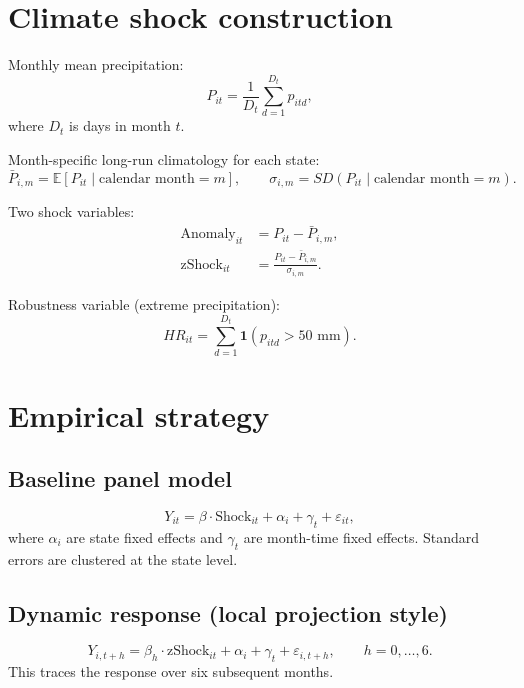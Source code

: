 \documentclass[11pt]{article}
\begin{document}
\section{Climate shock construction}
Monthly mean precipitation:
\begin{equation}
P_{it} = \frac{1}{D_t}\sum_{d=1}^{D_t} p_{itd},
\end{equation}
where $D_t$ is days in month $t$.

Month-specific long-run climatology for each state:
\begin{equation}
\bar P_{i,m} = \mathbb{E}[P_{it}\mid \text{calendar month}=m], \qquad
\sigma_{i,m} = SD(P_{it}\mid \text{calendar month}=m).
\end{equation}

Two shock variables:
\begin{align}
\text{Anomaly}_{it} &= P_{it} - \bar P_{i,m}, \\
\text{zShock}_{it} &= \frac{P_{it} - \bar P_{i,m}}{\sigma_{i,m}}.
\end{align}

Robustness variable (extreme precipitation):
\begin{equation}
HR_{it}=\sum_{d=1}^{D_t}\mathbf{1}(p_{itd}>50\text{ mm}).
\end{equation}

\section{Empirical strategy}
\subsection{Baseline panel model}
\begin{equation}
Y_{it} = \beta \cdot \text{Shock}_{it} + \alpha_i + \gamma_t + \varepsilon_{it},
\end{equation}
where $\alpha_i$ are state fixed effects and $\gamma_t$ are month-time fixed effects. Standard errors are clustered at the state level.

\subsection{Dynamic response (local projection style)}
\begin{equation}
Y_{i,t+h} = \beta_h \cdot \text{zShock}_{it} + \alpha_i + \gamma_t + \varepsilon_{i,t+h},
\qquad h=0,\dots,6.
\end{equation}
This traces the response over six subsequent months.
\end{document}
